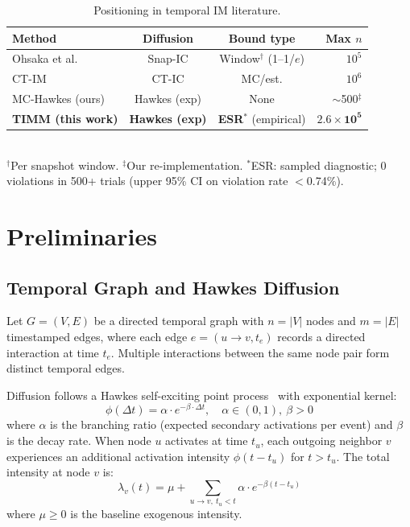 \documentclass[10pt,conference]{IEEEtran}
\newcommand{\tiimm}{TIMM\xspace}
\begin{document}
\begin{table}[t]
\centering
\caption{Positioning in temporal IM literature.}
\label{tab:positioning}
\footnotesize
\setlength{\tabcolsep}{4pt}
\begin{tabular}{@{}lccr@{}}
\toprule
Method & Diffusion & Bound type & Max $n$ \\
\midrule
Ohsaka et al.~\cite{ohsaka2016} & Snap-IC & Window$^\dagger$ (1--1/$e$) & $10^5$ \\
CT-IM~\cite{gomez2012,du2013} & CT-IC & MC/est. & $10^6$ \\
MC-Hawkes (ours) & Hawkes (exp) & None & $\sim$500$^\ddagger$ \\
\textbf{\tiimm{} (this work)} & \textbf{Hawkes (exp)} & \textbf{ESR}$^*$ (empirical) & $\mathbf{2.6\times10^5}$ \\
\bottomrule
\end{tabular}\\[3pt]
$^\dagger$Per snapshot window. \; $^\ddagger$Our re-implementation. \; $^*$ESR: sampled diagnostic; 0 violations in 500+ trials (upper 95\% CI on violation rate $<$0.74\%).
\end{table}

\section{Preliminaries}

\subsection{Temporal Graph and Hawkes Diffusion}

Let $G = (V, E)$ be a directed temporal graph with $n = |V|$ nodes and $m = |E|$ timestamped edges, where each edge $e = (u \rightarrow v, t_e)$ records a directed interaction at time $t_e$.
Multiple interactions between the same node pair form distinct temporal edges.

Diffusion follows a Hawkes self-exciting point process~\cite{hawkes1971} with exponential kernel:
\begin{equation}
\phi(\Delta t) = \alpha \cdot e^{-\beta \cdot \Delta t},\quad \alpha \in (0,1),\ \beta > 0
\label{eq:hawkes_kernel}
\end{equation}
where $\alpha$ is the branching ratio (expected secondary activations per event) and $\beta$ is the decay rate.
When node $u$ activates at time $t_u$, each outgoing neighbor $v$ experiences an additional activation intensity $\phi(t - t_u)$ for $t > t_u$.
The total intensity at node $v$ is:
\begin{equation}
\lambda_v(t) = \mu + \sum_{u \rightarrow v,\ t_u < t} \alpha \cdot e^{-\beta(t - t_u)}
\label{eq:total_intensity}
\end{equation}
where $\mu \ge 0$ is the baseline exogenous intensity.
\end{document}
